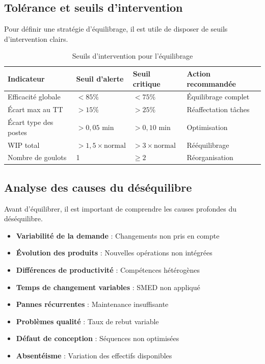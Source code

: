 \documentclass[12pt,a4paper]{article}
\newenvironment{methodbox}[1]
  {\begin{tcolorbox}[colback=blue!5!white, colframe=methodcolor, title=#1]\small}
  {\end{tcolorbox}}
\begin{document}
\subsection{Tolérance et seuils d'intervention}

Pour définir une stratégie d'équilibrage, il est utile de disposer de seuils d'intervention clairs.

\begin{table}[H]
\centering
\begin{tabular}{|p{3.5cm}|p{2.5cm}|p{2.5cm}|p{3.5cm}|}
\hline
\textbf{Indicateur} & \textbf{Seuil d'alerte} & \textbf{Seuil critique} & \textbf{Action recommandée} \\
\hline
Efficacité globale & $< 85\%$ & $< 75\%$ & Équilibrage complet \\
\hline
Écart max au TT & $> 15\%$ & $> 25\%$ & Réaffectation tâches \\
\hline
Écart type des postes & $> 0,05$ min & $> 0,10$ min & Optimisation \\
\hline
WIP total & $> 1,5 \times \text{normal}$ & $> 3 \times \text{normal}$ & Rééquilibrage \\
\hline
Nombre de goulots & 1 & $\geq 2$ & Réorganisation \\
\hline
\end{tabular}
\caption{Seuils d'intervention pour l'équilibrage}
\end{table}

\subsection{Analyse des causes du déséquilibre}

Avant d'équilibrer, il est important de comprendre les causes profondes du déséquilibre.

\begin{methodbox}{Causes fréquentes de déséquilibre}
\begin{itemize}
    \item \textbf{Variabilité de la demande} : Changements non pris en compte
    \item \textbf{Évolution des produits} : Nouvelles opérations non intégrées
    \item \textbf{Différences de productivité} : Compétences hétérogènes
    \item \textbf{Temps de changement variables} : SMED non appliqué
    \item \textbf{Pannes récurrentes} : Maintenance insuffisante
    \item \textbf{Problèmes qualité} : Taux de rebut variable
    \item \textbf{Défaut de conception} : Séquences non optimisées
    \item \textbf{Absentéisme} : Variation des effectifs disponibles
\end{itemize}
\end{methodbox}
\end{document}
